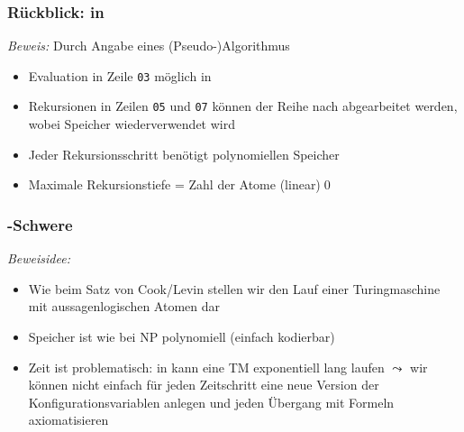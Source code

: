 \documentclass[aspectratio=1610,onlymath]{beamer}
\begin{document}
\begin{frame}\frametitle{Rückblick:  in \PSpace}

\pause

\emph{Beweis:} Durch Angabe eines (Pseudo-)Algorithmus

\smallskip

\begin{itemize}
\item Evaluation in Zeile \texttt{03} möglich in \PSpace
\item Rekursionen in Zeilen \texttt{05} und \texttt{07} können der Reihe nach abgearbeitet werden, wobei Speicher wiederverwendet wird
\item Jeder Rekursionsschritt benötigt polynomiellen Speicher
\item Maximale Rekursionstiefe = Zahl der Atome (linear)\qed
\end{itemize}


\end{frame}

\begin{frame}\frametitle{\PSpace-Schwere}

\bigskip\pause

\pause

\emph{Beweisidee:}
\begin{itemize}
\item Wie beim Satz von Cook/Levin stellen wir den Lauf einer Turingmaschine
mit aussagenlogischen Atomen dar
\item Speicher ist wie bei NP polynomiell (einfach kodierbar)
\item Zeit ist problematisch: in \PSpace kann eine TM exponentiell lang laufen
$\leadsto$ wir können nicht einfach für jeden Zeitschritt eine neue Version
der Konfigurationsvariablen anlegen und jeden Übergang mit Formeln axiomatisieren
\end{itemize}

\end{frame}
\end{document}
